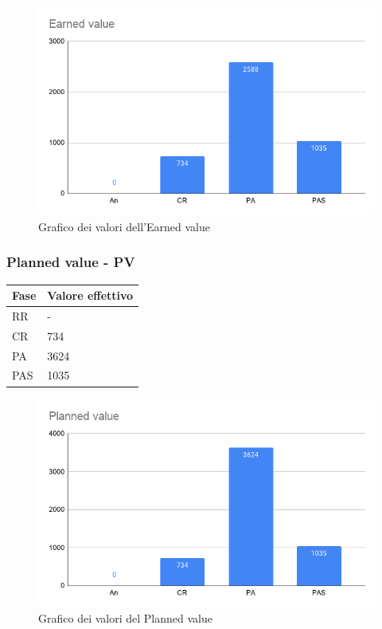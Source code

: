     \begin{figure}[H]
        \centering
        \includegraphics[width=10 cm]{source/sections/images/Earned_value.png}
        \caption{Grafico dei valori dell'Earned value}
    \end{figure}

    \newpage
\subsubsection{Planned value - PV}

\begin{longtabu} to \textwidth {| X[0.1,c m] | X[0.1,c m] | }
    \hline
    \textbf{Fase} &
    \textbf{Valore effettivo} \\
    \hline
    RR & - \\
    \hline
    CR & 734 \\
    \hline
    PA & 3624 \\
    \hline
    PAS & 1035 \\
    \hline 
    \end{longtabu}

    \begin{figure}[H]
        \centering
        \includegraphics[width=10 cm]{source/sections/images/planned_value.png}
        \caption{Grafico dei valori del Planned value}
    \end{figure}

